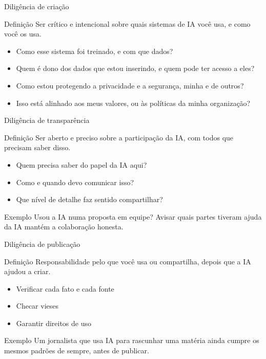 \documentclass[aspectratio=169,11pt]{beamer}
\begin{document}
\begin{frame}{Diligência de criação}
  \begin{notebox}{Definição}
    \small Ser crítico e intencional sobre quais sistemas de IA você usa, e como você os usa.
  \end{notebox}
  \vspace{0.25cm}
  \begin{itemize}
    \item Como esse sistema foi treinado, e com que dados?
    \item Quem é dono dos dados que estou inserindo, e quem pode ter acesso a eles?
    \item Como estou protegendo a privacidade e a segurança, minha e de outros?
    \item Isso está alinhado aos meus valores, ou às políticas da minha organização?
  \end{itemize}
\end{frame}

\begin{frame}{Diligência de transparência}
  \begin{notebox}{Definição}
    \small Ser aberto e preciso sobre a participação da IA, com todos que precisam saber disso.
  \end{notebox}
  \vspace{0.25cm}
  \begin{itemize}
    \item Quem precisa saber do papel da IA aqui?
    \item Como e quando devo comunicar isso?
    \item Que nível de detalhe faz sentido compartilhar?
  \end{itemize}
  \vspace{0.2cm}
  \begin{alertbox}{Exemplo}
    \small Usou a IA numa proposta em equipe? Avisar quais partes tiveram ajuda da IA mantém a colaboração honesta.
  \end{alertbox}
\end{frame}

\begin{frame}{Diligência de publicação}
  \begin{notebox}{Definição}
    \small Responsabilidade pelo que você usa ou compartilha, depois que a IA ajudou a criar.
  \end{notebox}
  \vspace{0.25cm}
  \begin{itemize}
    \item Verificar cada fato e cada fonte
    \item Checar vieses
    \item Garantir direitos de uso
  \end{itemize}
  \vspace{0.2cm}
  \begin{alertbox}{Exemplo}
    \small Um jornalista que usa IA para rascunhar uma matéria ainda cumpre os mesmos padrões de sempre, antes de publicar.
  \end{alertbox}
\end{frame}
\end{document}
